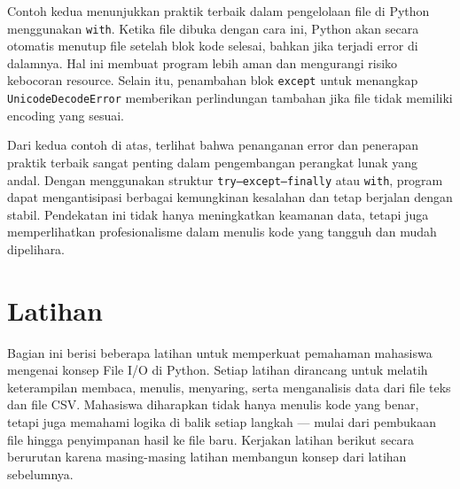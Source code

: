 Contoh kedua menunjukkan praktik terbaik dalam pengelolaan file di Python menggunakan \texttt{with}.  
Ketika file dibuka dengan cara ini, Python akan secara otomatis menutup file setelah blok kode selesai, bahkan jika terjadi error di dalamnya.  
Hal ini membuat program lebih aman dan mengurangi risiko kebocoran resource.  
Selain itu, penambahan blok \texttt{except} untuk menangkap \texttt{UnicodeDecodeError} memberikan perlindungan tambahan jika file tidak memiliki encoding yang sesuai.

Dari kedua contoh di atas, terlihat bahwa penanganan error dan penerapan praktik terbaik sangat penting dalam pengembangan perangkat lunak yang andal.  
Dengan menggunakan struktur \texttt{try--except--finally} atau \texttt{with}, program dapat mengantisipasi berbagai kemungkinan kesalahan dan tetap berjalan dengan stabil.  
Pendekatan ini tidak hanya meningkatkan keamanan data, tetapi juga memperlihatkan profesionalisme dalam menulis kode yang tangguh dan mudah dipelihara.


\section{Latihan}

Bagian ini berisi beberapa latihan untuk memperkuat pemahaman mahasiswa mengenai konsep File I/O di Python.  
Setiap latihan dirancang untuk melatih keterampilan membaca, menulis, menyaring, serta menganalisis data dari file teks dan file CSV.  
Mahasiswa diharapkan tidak hanya menulis kode yang benar, tetapi juga memahami logika di balik setiap langkah — mulai dari pembukaan file hingga penyimpanan hasil ke file baru.  
Kerjakan latihan berikut secara berurutan karena masing-masing latihan membangun konsep dari latihan sebelumnya.

